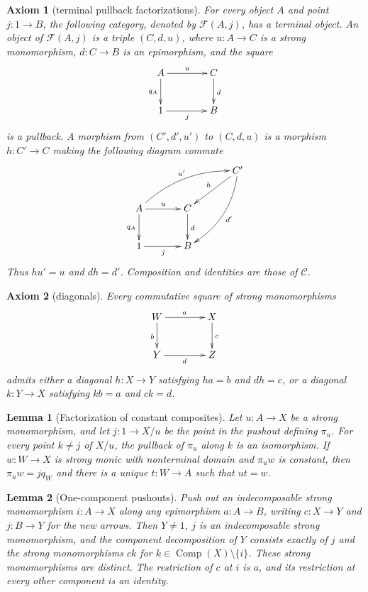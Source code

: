 \documentclass[10pt,a4paper]{amsart}
\newtheorem{axiom}{Axiom}
\newtheorem{lemma}{Lemma}
\newcommand{\C}{\mathcal C}
\newcommand{\Comp}{\operatorname{Comp}}
\newcommand{\Fill}{\mathcal F}
\newcommand{\one}{1}
\begin{document}
\begin{axiom}[terminal pullback factorizations]\label{ax:U}
For every object $A$ and point $j:\one\to B$, the following
category, denoted by $\Fill(A,j)$, has a terminal object. An
object of $\Fill(A,j)$ is a triple $(C,d,u)$, where
$u:A\to C$ is a strong monomorphism, $d:C\to B$ is an
epimorphism, and the square
\begin{equation}\label{eq:fillsquare}
\vcenter{\xymatrix@C=4em@R=2.5em{
A\ar[r]^u\ar[d]_{q_A}&C\ar[d]^d\\
 \one\ar[r]_j&B
}}
\end{equation}
is a pullback. A morphism from $(C',d',u')$ to $(C,d,u)$ is
a morphism $h:C'\to C$ making the following diagram commute
\[
\xymatrix@C=3.5em@R=2.5em{
&&C'\ar[dl]_h\ar@/^1pc/[ddl]^{d'}\\
A\ar[r]^u\ar[d]_{q_A}\ar@/^1pc/[urr]^{u'}&C\ar[d]^d&\\
\one\ar[r]_j&B&
}
\]
Thus $hu'=u$ and $dh=d'$.
Composition and identities are those of $\C$.
\end{axiom}

\begin{axiom}[diagonals]\label{ax:O}
Every commutative square of strong monomorphisms
\[
\xymatrix@C=4em@R=2.5em{
W \ar[r]^{a} \ar[d]_{b} & X \ar[d]^{c} \\
Y \ar[r]_{d} & Z
}
\]
admits either a diagonal $h:X\to Y$ satisfying $ha=b$ and $dh=c$,
or a diagonal $k:Y\to X$ satisfying $kb=a$ and $ck=d$.
\end{axiom}

\begin{lemma}[Factorization of constant composites]\label{lem:constantfactor}
Let $u:A\to X$ be a strong monomorphism, and let $j:\one\to X/u$
be the point in the pushout defining $\pi_u$.
For every point $k\ne j$ of $X/u$, the pullback of $\pi_u$ along
$k$ is an isomorphism.
If $w:W\to X$ is strong monic with nonterminal domain and $\pi_u w$
is constant, then $\pi_u w=jq_W$ and there is a unique $t:W\to A$
such that $ut=w$.
\end{lemma}

\begin{lemma}[One-component pushouts]\label{lem:componentpushout}
Push out an indecomposable strong monomorphism $i:A\to X$ along any epimorphism
$a:A\to B$, writing $c:X\to Y$ and $j:B\to Y$ for the new arrows.
Then $Y\ne\one$, $j$ is an indecomposable strong monomorphism, and the component
decomposition of $Y$ consists exactly of $j$ and the strong monomorphisms
$ck$ for $k\in\Comp(X)\setminus\{i\}$. These strong monomorphisms are
distinct. The restriction of $c$ at $i$ is $a$, and its restriction
at every other component is an identity.
\end{lemma}
\end{document}
